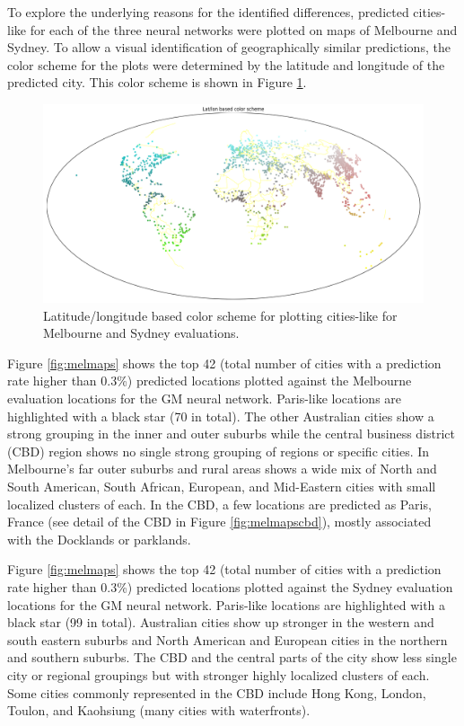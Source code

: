 \documentclass[sageh,times]{sagej}
\begin{document}
To explore the underlying reasons for the identified differences, predicted cities-like for each of the three neural networks were plotted on maps of Melbourne and Sydney. To allow a visual identification of geographically similar predictions, the color scheme for the plots were determined by the latitude and longitude of the predicted city. This color scheme is shown in Figure \ref{fig:colorscheme}. 


\begin{figure}[!htbp]
\centering    
\includegraphics[scale=0.25]{Images/World_map_color_scheme.png} 
\caption{Latitude/longitude based color scheme for plotting cities-like for Melbourne and Sydney evaluations.}    
 \label{fig:colorscheme}  
\end{figure} 


Figure \ref{fig:melmaps} shows the top 42 (total number of cities with a prediction rate higher than 0.3\%) predicted locations plotted against the Melbourne evaluation locations for the GM neural network. Paris-like locations are highlighted with a black star (70 in total). The other Australian cities show a strong grouping in the inner and outer suburbs while the central business district (CBD) region shows no single strong grouping of regions or specific cities. In Melbourne's far outer suburbs and rural areas shows a wide mix of North and South American, South African, European, and Mid-Eastern cities with small localized clusters of each. In the CBD, a few locations are predicted as Paris, France (see detail of the CBD in Figure \ref{fig:melmapscbd}), mostly associated with the Docklands or parklands.

Figure \ref{fig:melmaps} shows the top 42 (total number of cities with a prediction rate higher than 0.3\%) predicted locations plotted against the Sydney evaluation locations for the GM neural network. Paris-like locations are highlighted with a black star (99 in total).  Australian cities show up stronger in the western and south eastern suburbs and North American and European cities in the northern and southern suburbs. The CBD and the central parts of the city show less single city or regional groupings but with stronger highly localized clusters of each. Some cities commonly represented in the CBD include Hong Kong, London, Toulon, and Kaohsiung (many cities with waterfronts). 
\end{document}
